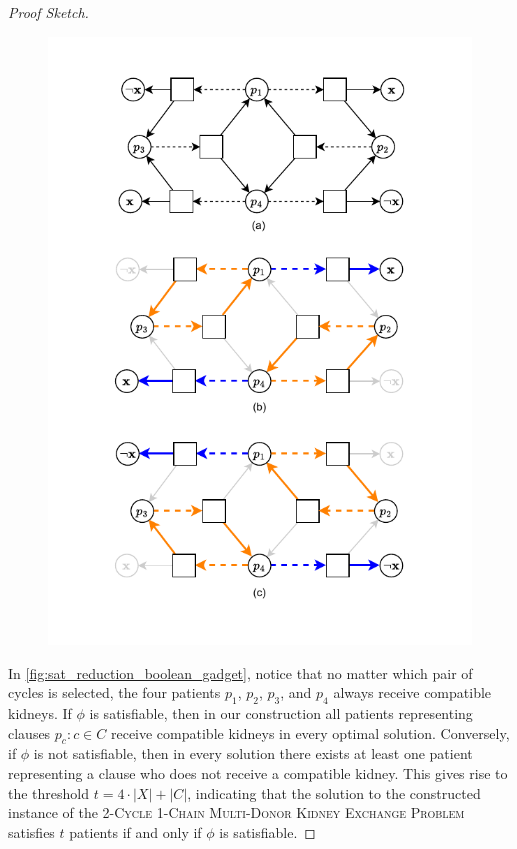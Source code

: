 \begin{proof}[Proof Sketch]
\begin{figure}
    \centering
    \includegraphics{data/sat_reduction_boolean_gadget.pdf}
    \caption[]{}
    \label{fig:sat_reduction_boolean_gadget}
\end{figure}

In \autoref{fig:sat_reduction_boolean_gadget}, notice that no matter which pair of cycles is selected, the four patients $p_1$, $p_2$, $p_3$, and $p_4$ always receive compatible kidneys. If $\phi$ is satisfiable, then in our construction all patients representing clauses ${ p_c : c \in C }$ receive compatible kidneys in every optimal solution. Conversely, if $\phi$ is not satisfiable, then in every solution there exists at least one patient representing a clause who does not receive a compatible kidney. This gives rise to the threshold $t = 4 \cdot |X| + |C|$, indicating that the solution to the constructed instance of the \textsc{2-Cycle 1-Chain Multi-Donor Kidney Exchange Problem} satisfies $t$ patients if and only if $\phi$ is satisfiable.
\end{proof}


